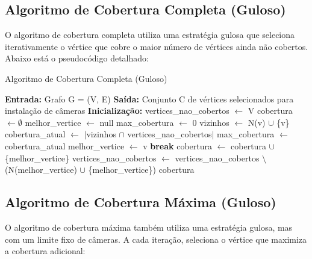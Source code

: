 \documentclass[12pt, a4paper]{report}
\begin{document}
\subsection{Algoritmo de Cobertura Completa (Guloso)}
O algoritmo de cobertura completa utiliza uma estratégia gulosa que seleciona iterativamente o vértice que cobre o maior número de vértices ainda não cobertos. Abaixo está o pseudocódigo detalhado:

\begin{algorithm}[H]
\caption{Algoritmo de Cobertura Completa (Guloso)}
\begin{algorithmic}[1]
\State \textbf{Entrada:} Grafo G = (V, E)
\State \textbf{Saída:} Conjunto C de vértices selecionados para instalação de câmeras
\Statex
\State \textbf{Inicialização:}
\State vertices\_nao\_cobertos $\gets$ V
\State cobertura $\gets \emptyset$
\Statex
{}
    \State melhor\_vertice $\gets$ null
    \State max\_cobertura $\gets$ 0
            \State vizinhos $\gets$ N(v) $\cup$ \{v\} 
            \State cobertura\_atual $\gets$ $\lvert$vizinhos $\cap$ vertices\_nao\_cobertos$\rvert$
                \State max\_cobertura $\gets$ cobertura\_atual
                \State melhor\_vertice $\gets$ v
            \EndIf
        \EndIf
    \EndFor
        \State \textbf{break}
    \EndIf
    \State cobertura $\gets$ cobertura $\cup$ \{melhor\_vertice\}
    \State vertices\_nao\_cobertos $\gets$ vertices\_nao\_cobertos $\setminus$ (N(melhor\_vertice) $\cup$ \{melhor\_vertice\})
\EndWhile
\State \Return cobertura
\end{algorithmic}
\end{algorithm}

\subsection{Algoritmo de Cobertura Máxima (Guloso)}
O algoritmo de cobertura máxima também utiliza uma estratégia gulosa, mas com um limite fixo de câmeras. A cada iteração, seleciona o vértice que maximiza a cobertura adicional:
\end{document}
